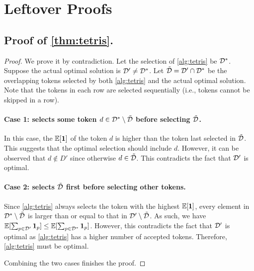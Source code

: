 


\section{Leftover Proofs}

\subsection{Proof of \texorpdfstring{\cref{thm:tetris}}{Theorem 1}.}
\label{app:proof_of_local_tetris}

\tetris*
\begin{proof}
    We prove it by contradiction. Let the selection of \cref{alg:tetris} be ${\mathcal{D}}^*$. Suppose the actual optimal solution is ${\mathcal{D}}' \neq {\mathcal{D}}^*$. Let $\tilde{{\mathcal{D}}} = {\mathcal{D}}' \cap {\mathcal{D}}^*$ be the overlapping tokens selected by both \cref{alg:tetris} and the actual optimal solution. Note that the tokens in each row are selected sequentially (i.e., tokens cannot be skipped in a row). 

    \paragraph{Case 1: \alg{} selects some token $d \in {\mathcal{D}}^* \setminus \tilde{{\mathcal{D}}}$ before selecting $\tilde{{\mathcal{D}}}$.} In this case, the $\mathbb{E}[{\bm{1}}]$ of the token $d$ is higher than the token last selected in $\tilde{{\mathcal{D}}}$. This suggests that the optimal selection should include $d$. However, it can be observed that $d \notin D'$ since otherwise $d \in \tilde{{\mathcal{D}}}$. This contradicts the fact that ${\mathcal{D}}'$ is optimal.

    \paragraph{Case 2: \alg{} selects $\tilde{{\mathcal{D}}}$ first before selecting other tokens.} Since \cref{alg:tetris} always selects the token with the highest $\mathbb{E}[{\bm{1}}]$, every element in ${\mathcal{D}}^* \setminus \tilde{{\mathcal{D}}}$ is larger than or equal to that in ${\mathcal{D}}' \setminus \tilde{{\mathcal{D}}}$. As such, we have 
    $\mathbb{E}[\sum_{p \in {\mathcal{D}}'} \mathbf{1}_p] \leq \mathbb{E}[\sum_{p \in {\mathcal{D}}^*} \mathbf{1}_p]$. However, this contradicts the fact that ${\mathcal{D}}'$ is optimal as \cref{alg:tetris} has a higher number of accepted tokens. Therefore, \cref{alg:tetris} must be optimal. 
    
    Combining the two cases finishes the proof.
\end{proof}

